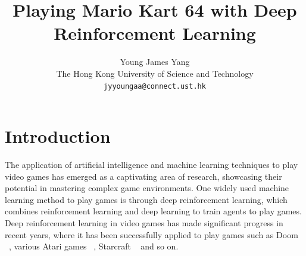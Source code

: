 \documentclass[10pt,twocolumn,letterpaper]{article}
\begin{document}
\title{Playing Mario Kart 64 with Deep Reinforcement Learning}

\author{Young James Yang\\
The Hong Kong University of Science and Technology\\
{\tt\small jyyoungaa@connect.ust.hk}
}
\maketitle



\section{Introduction}
\label{sec:intro}


The application of artificial intelligence and machine learning techniques to play video games has emerged as a captivating area of research, showcasing their potential in mastering complex game environments. One widely used machine learning method to play games is through deep reinforcement learning, which combines reinforcement learning and deep learning to train agents to play games. Deep reinforcement learning in video games has made significant progress in recent years, where it has been successfully applied to play games such as Doom ~\cite{papoudakis2018deep}, various Atari games ~\cite{mnih2013playing}, Starcraft ~\cite{vinyals2017starcraft} and so on. 
\end{document}

